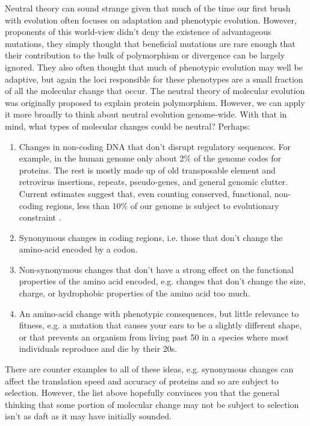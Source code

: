 Neutral theory can sound strange given that much of the time our first brush with evolution often focuses on adaptation and phenotypic evolution. However, proponents of this world-view didn't deny the existence of advantageous mutations, they simply thought that beneficial mutations are rare enough that their contribution to the bulk of polymorphism or divergence can be largely ignored. They also often thought that much of phenotypic evolution may well be adaptive, but again the loci responsible for these phenotypes are a small fraction of all the molecular change that occur. The neutral theory of molecular evolution was originally proposed to explain protein polymorphism. However, we can apply it more broadly to think about neutral evolution genome-wide. With that in mind, what types of molecular changes could be neutral? Perhaps:
\begin{enumerate}
\item Changes in non-coding DNA that don't disrupt regulatory sequences. For example, in the human genome only about 2\% of the genome codes for proteins. The rest is mostly made up of old transposable element and retrovirus insertions, repeats, pseudo-genes, and general genomic clutter. Current estimates suggest that, even counting conserved, functional, non-coding regions, less than 10\% of our genome is subject to evolutionary constraint \citep{rands:14}.
\item Synonymous changes in coding regions, i.e. those that don't change the amino-acid encoded by a codon.
\item Non-synonymous changes that don't have a strong effect on the functional properties of the amino acid encoded, e.g. changes that don't change the size, charge, or hydrophobic properties of the amino acid too much.
\item An amino-acid change with phenotypic consequences, but little relevance to fitness, e.g. a mutation that causes your ears to be a slightly different shape, or that prevents an organism from living past 50 in a species where most individuals reproduce and die by their 20s.
\end{enumerate}
There are counter examples to all of these ideas, e.g. synonymous changes can affect the translation speed and accuracy of proteins and so are subject to selection. However, the list above hopefully convinces you that the general thinking that some portion of molecular change may not be subject to selection isn't as daft as it may have initially sounded.

